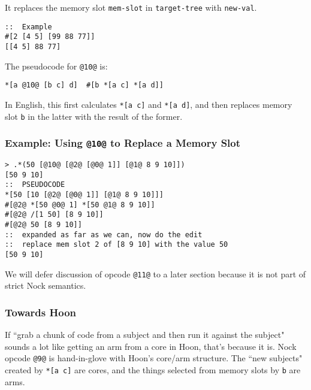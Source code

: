 \documentclass[twoside]{article}
\begin{document}
\noindent{}
It replaces the memory slot \lstinline[style=inlinecode]{mem-slot} in \lstinline[style=inlinecode]{target-tree} with \lstinline[style=inlinecode]{new-val}.

\begin{lstlisting}[style=listingcode]
::  Example
#[2 [4 5] [99 88 77]]
[[4 5] 88 77]
\end{lstlisting}

\noindent{}
The pseudocode for \lstinline[style=inlinecode]{@10@} is:

\begin{lstlisting}[style=listingcode]
*[a @10@ [b c] d]  #[b *[a c] *[a d]]
\end{lstlisting}

In English, this first calculates \lstinline[style=inlinecode]{*[a c]} and \lstinline[style=inlinecode]{*[a d]}, and then replaces memory slot \lstinline[style=inlinecode]{b} in the latter with the result of the former.

\subsubsection{Example: Using \lstinline[style=inlinecode]{@10@} to Replace a Memory Slot}

\begin{lstlisting}[style=listingcode]
> .*(50 [@10@ [@2@ [@0@ 1]] [@1@ 8 9 10]])
[50 9 10]
::  PSEUDOCODE
*[50 [10 [@2@ [@0@ 1]] [@1@ 8 9 10]]]
#[@2@ *[50 @0@ 1] *[50 @1@ 8 9 10]]
#[@2@ /[1 50] [8 9 10]]
#[@2@ 50 [8 9 10]]
::  expanded as far as we can, now do the edit
::  replace mem slot 2 of [8 9 10] with the value 50
[50 9 10]
\end{lstlisting}

We will defer discussion of opcode \lstinline[style=inlinecode]{@11@} to a later section because it is not part of strict Nock semantics.

\subsubsection{Towards Hoon}

If ``grab a chunk of code from a subject and then run it against the subject" sounds a lot like getting an arm from a core in Hoon, that's because it is.  Nock opcode \lstinline[style=inlinecode]{@9@} is hand-in-glove with Hoon's core/arm structure.  The ``new subjects" created by \lstinline[style=inlinecode]{*[a c]} are cores, and the things selected from memory slots by \lstinline[style=inlinecode]{b} are arms.
\end{document}
